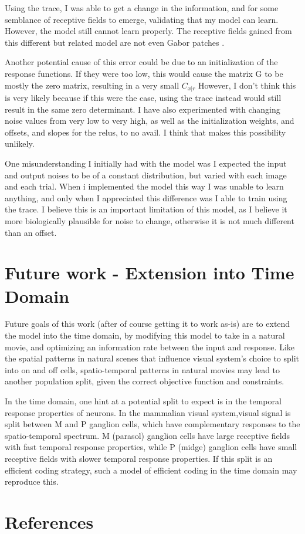 \documentclass{article}
\begin{document}
Using the trace, I was able to get a change in the information, and for some semblance of receptive fields to emerge, validating that my model can learn. However, the model still cannot learn properly. The receptive fields gained from this different but related model are not even Gabor patches \cite{fig:traceresults}. \par
	Another potential cause of this error could be due to an initialization of the response functions. If they were too low, this would cause the matrix G to be mostly the zero matrix, resulting in a very small $C_{x|r}$ However, I don't think this is very likely because if this were the case, using the trace instead would still result in the same zero determinant. I have also experimented with changing noise values from very low to very high, as well as the initialization weights, and offsets, and slopes for the relus, to no avail. I think that makes this possibility unlikely.\par
	One misunderstanding I initially had with the model was I expected the input and output noises to be of a constant distribution, but varied with each image and each trial. When i implemented the model this way I was unable to learn anything, and only when I appreciated this difference was I able to train using the trace. I believe this is an important limitation of this model, as I believe it more biologically plausible for noise to change, otherwise it is not much different than an offset. \par


\section{Future work - Extension into Time Domain}


Future goals of this work (after of course getting it to work as-is) are to extend the model into the time domain, by modifying this model to take in a natural movie, and optimizing an information rate between the input and response. Like the spatial patterns in natural scenes that influence visual system’s choice to split into on and off cells, spatio-temporal patterns in natural movies may lead to another population split, given the correct objective function and constraints.  \par
In the time domain, one hint at a potential split to expect is in the temporal response properties of neurons. In the mammalian visual system,visual signal is split between M and P ganglion cells, which have complementary responses to the spatio-temporal spectrum. M (parasol) ganglion cells have large receptive fields with fast temporal response properties, while  P (midge) ganglion cells have small receptive fields with slower temporal response properties. If this split is an efficient coding strategy, such a model of efficient coding in the time domain may reproduce this. \par




\section{References}


%
{\footnotesize }
\end{document}
